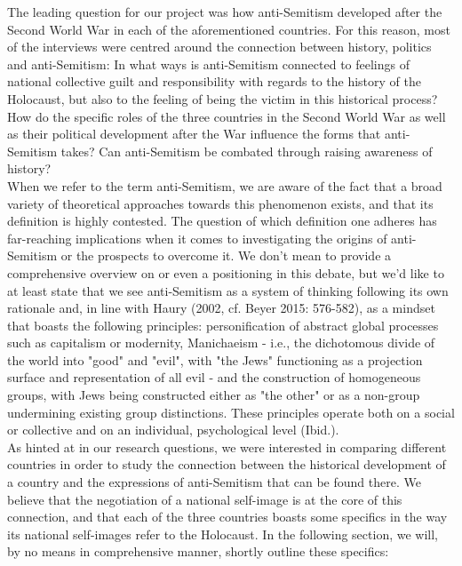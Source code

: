 The leading question for our project was how anti-Semitism developed after the Second World War in each of the aforementioned countries. For this reason, most of the interviews were centred around the connection between history, politics and anti-Semitism: In what ways is anti-Semitism connected to feelings of national collective guilt and responsibility with regards to the history of the Holocaust, but also to the feeling of being the victim in this historical process? How do the specific roles of the three countries in the Second World War as well as their political development after the War influence the forms that anti-Semitism takes? Can anti-Semitism be combated through raising awareness of history? \\
When we refer to the term anti-Semitism, we are aware of the fact that a broad variety of theoretical approaches towards this phenomenon exists, and that its definition is highly contested. The question of which definition one adheres has far-reaching implications when it comes to investigating the origins of anti-Semitism or the prospects to overcome it. We don't mean to provide a comprehensive overview on or even a positioning in this debate, but we'd like to at least state that we see anti-Semitism as a system of thinking following its own rationale and, in line with Haury (2002, cf. Beyer 2015: 576-582), as a mindset that boasts the following principles: personification of abstract global processes such as capitalism or modernity, Manichaeism - i.e., the dichotomous divide of the world into "good" and "evil", with "the Jews" functioning as a projection surface and representation of all evil - and the construction of homogeneous groups, with Jews being constructed either as "the other" or as a non-group undermining existing group distinctions. These principles operate both on a social or collective and on an individual, psychological level (Ibid.).\\
 As hinted at in our research questions, we were interested in comparing different countries in order to study the connection between the historical development of a country and the expressions of anti-Semitism that can be found there. We believe that the negotiation of a national self-image is at the core of this connection, and that each of the three countries boasts some specifics in the way its national self-images refer to the Holocaust. In the following section, we will, by no means in comprehensive manner, shortly outline these specifics: \\
